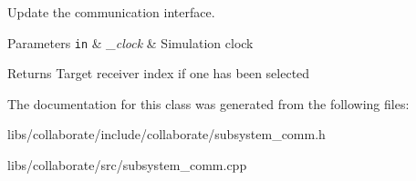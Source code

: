 Update the communication interface. 


\begin{DoxyParams}[1]{Parameters}
\mbox{\tt in}  & {\em \+\_\+clock} & Simulation clock \\
\hline
\end{DoxyParams}
\begin{DoxyReturn}{Returns}
Target receiver index if one has been selected 
\end{DoxyReturn}


The documentation for this class was generated from the following files\+:\begin{DoxyCompactItemize}
\item 
libs/collaborate/include/collaborate/subsystem\+\_\+comm.\+h\item 
libs/collaborate/src/subsystem\+\_\+comm.\+cpp\end{DoxyCompactItemize}
